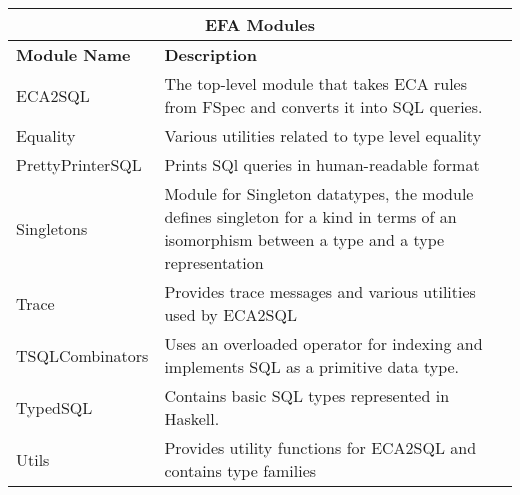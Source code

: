 \documentclass[12pt]{report}
\begin{document}
\begin{adjustbox}{center}
    \begin{tabular}{ |p{3.2cm}|p{11cm}|  }
        \hline
        \multicolumn{2}{|c|}{\bfseries{\large{EFA Modules}}} \\
        \hline\hline
        \bfseries{Module Name} & \bfseries{Description}\\
        \hline
        ECA2SQL & The top-level module that takes ECA rules from FSpec and 
        converts it into SQL queries.    \\ 
        \hline
        Equality & Various utilities related to type level equality   \\ 
        \hline
        PrettyPrinterSQL & Prints SQl queries in human-readable format    \\ 
        \hline
        Singletons & Module for Singleton datatypes, the module defines 
        singleton for a kind in terms of an isomorphism between a type and a 
        type representation   \\ 
        \hline
        Trace & Provides trace messages and various utilities used by 
        ECA2SQL    \\ 
        \hline
        TSQLCombinators & Uses an overloaded operator for indexing and 
        implements SQL as a primitive data type.   \\ 
        \hline
        TypedSQL & Contains basic SQL types represented in Haskell.    \\ 
        \hline
        Utils & Provides utility functions for ECA2SQL and contains type 
        families    \\ 
        \hline
    \end{tabular}
\end{adjustbox}


%
\end{document}
